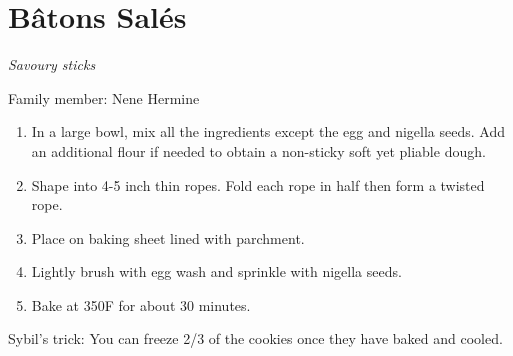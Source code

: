 \chapter{Bâtons Salés}
\label{ch:batonsale}


\textit{Savoury sticks}

Family member: Nene Hermine

\begin{enumerate}
    \item In a large bowl, mix all the ingredients except the egg and nigella seeds. Add an additional flour if needed to obtain a non-sticky soft yet pliable dough.
    \item Shape into 4-5 inch thin ropes. Fold each rope in half then form a twisted rope.
    \item Place on baking sheet lined with parchment.
    \item Lightly brush with egg wash and sprinkle with nigella seeds.
    \item Bake at 350\degree F for about 30 minutes.
\end{enumerate}

Sybil’s trick: You can freeze 2/3 of the cookies once they have baked and cooled.

